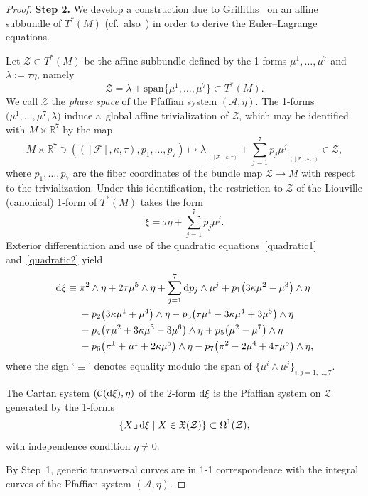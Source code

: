 \documentclass[pdftex]{sigma}
\numberwithin{equation}{section}
\begin{document}
\begin{proof}
\textbf{Step 2.}
We develop a construction due to Griffiths~\cite{Gr} on an affine subbundle of $T^*(M)$
 (cf.\ also~\cite{Bryant1987,Hsu, GM}) in order to derive the Euler--Lagrange equations.

Let $\mathcal{Z} \subset T^*(M)$ be the affine subbundle defined by
the 1-forms $\mu^1,\dots,\mu^7$ and $\lambda := \tau \eta$, namely
\[
 \mathcal{Z}=\lambda+\text{span}\big\{\mu^1,\dots,\mu^7\big\} \subset T^*(M).
\]
 We call $\mathcal{Z}$ the \textit{phase space} of the Pfaffian system $(\mathcal{A},\eta)$.
The 1-forms $\big(\mu^1,\dots,\mu^7, {\lambda}\big)$ induce a~global affine trivialization of $\mathcal{Z}$, which
may be identified with $M \times \mathbb{R}^7$ by the map
\[
M\times \mathbb{R}^7 \ni (([\mathcal{F}], \kappa, \tau), p_1, \dots, p_7) \longmapsto
{\lambda_{|_{([\mathcal{F}], \kappa, \tau)}} }
+ \sum_{j=1}^7 p_j{\mu^j}_{|_{([\mathcal{F}], \kappa, \tau)}} \in \mathcal{Z} ,
\]
where $p_1,\dots, p_7$ are the fiber coordinates of the bundle map $\mathcal{Z} \to M$ with respect to the trivialization.
Under this identification, the restriction to $\mathcal{Z}$ of the Liouville (canonical) 1-form of $T^*(M)$ takes the form
\[
 \xi=\tau  \eta + \sum_{j=1}^7p_j\mu^j .
 \]
Exterior differentiation and use of the quadratic equations~\eqref{quadratic1} and~\eqref{quadratic2} yield
\begin{align*}
 {\rm d}\xi\equiv{}& \pi^2\wedge\eta
+ 2\tau \mu^5 \wedge \eta + \sum_{j=1}^7{\rm d}p_j\wedge\mu^j + p_1\big(3\kappa\mu^2-\mu^3\big)\wedge\eta \\
&{} - p_2\big(3\kappa\mu^1+\mu^4\big)\wedge\eta - p_3\big(\tau\mu^1-3\kappa\mu^4+3\mu^5\big)\wedge\eta \\
 &{} - p_4\big(\tau\mu^2+3\kappa\mu^3-3\mu^6\big)\wedge\eta
 + p_5\big(\mu^2-\mu^7\big)\wedge\eta\\
 &{} - p_6\big(\pi^1+\mu^1+ 2\kappa\mu^5\big)\wedge\eta - p_7\big(\pi^2-2\mu^4+4\tau\mu^5\big)\wedge\eta  ,
\end{align*}
where the sign `$\equiv$' denotes equality modulo the span of $\{ \mu^i\wedge\mu^ j\}_{ i,j = 1,\dots,7}$.

The Cartan system $(\mathcal{C}({\rm d}\xi), \eta)$ of the
2-form ${\rm d}\xi$ is the Pfaffian system on $\mathcal{Z}$ generated by the 1-forms
\[
\left\{X {\lrcorner} \,{\rm d}\xi \mid X \in \mathfrak{X}(\mathcal{Z}) \right\}\subset \Omega^1(\mathcal{Z}),
\]
with independence condition $\eta \neq 0$.

By Step~1, generic transversal curves are in 1-1 correspondence with the integral curves of the
Pfaffian system $(\mathcal{A},\eta)$.


\end{proof}
\end{document}

